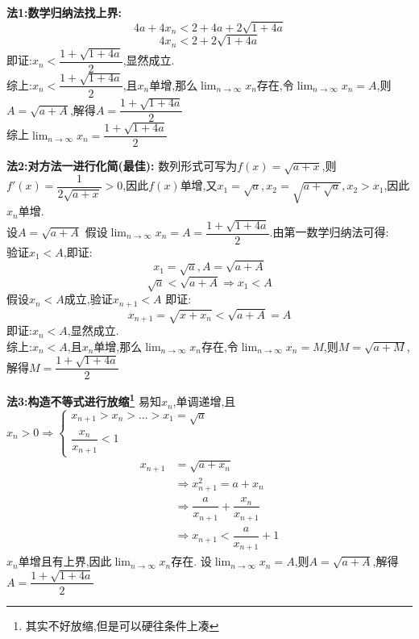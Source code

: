 \documentclass[8pt a4paper, oneside, UTF8]{ctexbook}
\begin{document}
\begin{sloppypar}
\begin{solution}{\textbf{法1:数学归纳法找上界:}}
$$            $$
            $$
                4a+4x_n<2+4a+2\sqrt{1+4a}
            $$
            $$
                4x_n<2+2\sqrt{1+4a}
            $$
            即证:$x_n <\dfrac{1+\sqrt{1+4a}}{2}$,显然成立.\\
            综上:$x_n < \dfrac{1+\sqrt{1+4a}}{2}$,且$x_n$单增,那么$\lim_{n\to \infty}x_n$存在,令$\lim_{n\to \infty}x_n=A$,则$A=\sqrt{a+A}$,解得$A=\dfrac{1+\sqrt{1+4a}}{2}$\\
            综上$\lim_{n\to \infty}x_n=\dfrac{1+\sqrt{1+4a}}{2}$
        \end{solution}
        \begin{solution}{\textbf{法2:对方法一进行化简(最佳):}}
            数列形式可写为$f(x)=\sqrt{a+x}$,则$f'(x)=\dfrac{1}{2\sqrt{a+x}}>0$,因此$f(x)$单增,又$x_1=\sqrt{a},x_2=\sqrt{a+\sqrt{a}},x_2>x_1$,因此$x_n$单增.\\
            设$A=\sqrt{a+A}$ 假设$\lim_{n\to \infty}x_n=A=\dfrac{1+\sqrt{1+4a}}{2}$.由第一数学归纳法可得:\\
            验证$x_1<A$,即证:$$
                x_1=\sqrt{a},A=\sqrt{a+A}
            $$
            $$
                \sqrt{a}<\sqrt{a+A} \Rightarrow x_1 <A
            $$
            假设$x_n<A$成立,验证$x_{n+1} < A $
            即证:$$
                x_{n+1}=\sqrt{x+x_n}<\sqrt{a+A}=A
            $$
            即证:$x_n < A$,显然成立.\\
            综上:$x_n < A$,且$x_n$单增,那么$\lim_{n\to \infty}x_n$存在,令$\lim_{n\to \infty}x_n=M$,则$M=\sqrt{a+M}$,解得$M=\dfrac{1+\sqrt{1+4a}}{2}$
        \end{solution}
        \begin{solution}{\textbf{法3:构造不等式进行放缩\footnote{其实不好放缩,但是可以硬往条件上凑}}}
            易知$x_n$,单调递增,且$x_n>0 \Rightarrow \begin{cases}
                x_{n+1}>x_n>...>x_1=\sqrt{a}\\
                \dfrac{x_n}{x_{n+1}}<1
            \end{cases}$
        \begin{align*}
          x_{n+1} & = \sqrt{a+x_n} \\
          & \Rightarrow x^2_{n+1}=a+x_n\\
          & \Rightarrow \dfrac{a}{x_{n+1}}+\dfrac{x_n}{x_{n+1}}\\
          & \Rightarrow x_{n+1}<\dfrac{a}{x_{n+1}}+1
        \end{align*}
        $x_n$单增且有上界,因此$\lim_{n\to \infty}x_n$存在.
        设$\lim_{n\to \infty}x_n=A$,则$A=\sqrt{a+A}$,解得$A=\dfrac{1+\sqrt{1+4a}}{2}$\\

\end{solution}
\end{sloppypar}
\end{document}
